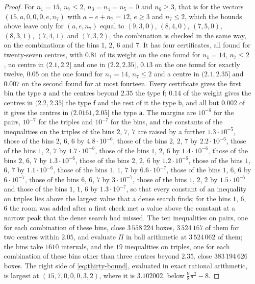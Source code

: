 \documentclass[11pt,reqno]{amsart}
\renewcommand{\_}{\origunderscore\allowbreak}
\numberwithin{equation}{section}
\theoremstyle{plain}
\theoremstyle{definition}
\theoremstyle{remark}
\begin{document}
\begin{proof}
For $n_1=15$, $n_7\le2$, $n_3=n_4=n_5=0$ and $n_6\ge3$, that is for the
vectors $(15,a,0,0,0,e,n_7)$ with $a+e+n_7=12$, $e\ge3$ and $n_7\le2$,
which the bounds above leave only for $(a,e,n_7)$ equal to $(9,3,0)$,
$(8,4,0)$, $(7,5,0)$, $(8,3,1)$, $(7,4,1)$ and $(7,3,2)$, the combination
is checked in the same way, on the combinations of the bins $1$, $2$, $6$
and $7$. It has four certificates, all found for twenty-seven centres,
with $0.81$ of its weight on the one found for $n_1=14$, $n_7\le2$, no
centre in $(2.1,2.2]$ and one in $(2.2,2.35]$, $0.13$ on the one found for
exactly twelve, $0.05$ on the one found for $n_1=14$, $n_7\le2$ and a
centre in $(2.1,2.35]$ and $0.007$ on the second found for at most
fourteen. Every certificate gives the first bin the type $\mathsf a$ and
the centres beyond $2.35$ the type $\mathsf f$; $0.14$ of the weight gives
the centres in $(2.2,2.35]$ the type $\mathsf f$ and the rest of it the
type $\mathsf b$, and all but $0.002$ of it gives the centres in
$(2.0161,2.05]$ the type $\mathsf a$. The margins are $10^{-6}$ for the
pairs, $10^{-7}$ for the triples and $10^{-7}$ for the bins, and the
constants of the inequalities on the triples of the bins $2$, $7$, $7$ are
raised by a further $1.3\cdot10^{-5}$, those of the bins $2$, $6$, $6$ by
$4.8\cdot10^{-6}$, those of the bins $2$, $2$, $7$ by $2.2\cdot10^{-6}$,
those of the bins $1$, $2$, $7$ by $1.7\cdot10^{-6}$, those of the bins
$1$, $2$, $6$ by $1.4\cdot10^{-6}$, those of the bins $2$, $6$, $7$ by
$1.3\cdot10^{-6}$, those of the bins $2$, $2$, $6$ by $1.2\cdot10^{-6}$,
those of the bins $1$, $6$, $7$ by $1.1\cdot10^{-6}$, those of the bins
$1$, $1$, $7$ by $6.6\cdot10^{-7}$, those of the bins $1$, $6$, $6$ by
$6\cdot10^{-7}$, those of the bins $6$, $6$, $7$ by $3\cdot10^{-7}$,
those of the bins $1$, $2$, $2$ by $1.5\cdot10^{-7}$ and those of the bins
$1$, $1$, $6$ by $1.3\cdot10^{-7}$, so that every constant of an
inequality on triples lies above the largest value that a dense search
finds; for the bins $1$, $6$, $6$ the room was added after a first check
met a value above the constant at a narrow peak that the dense search had
missed. The ten inequalities on pairs, one for each combination of these
bins, close $3\,558\,224$ boxes, $3\,524\,167$ of them for two centres
within $2.05$, and evaluate $\Pi$ in ball arithmetic at $3\,524\,062$ of
them; the bins take $1610$ intervals, and the $19$ inequalities on
triples, one for each combination of these bins other than three centres
beyond $2.35$, close $383\,194\,626$ boxes. The right side of
\eqref{eq:thirty-bound}, evaluated in exact rational arithmetic, is
largest at $(15,7,0,0,0,3,2)$, where it is $3.102002$, below
$\frac98\pi^2-8$.


\end{proof}
\end{document}
